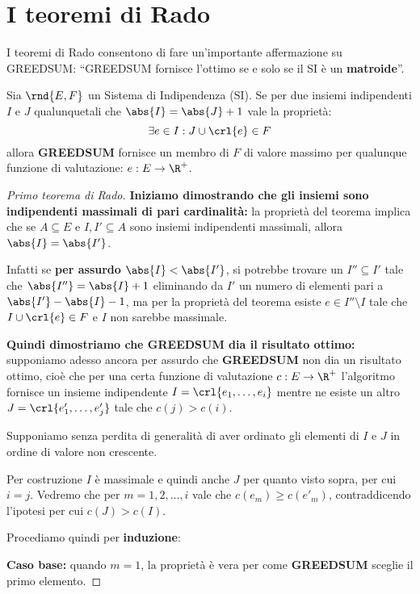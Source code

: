\documentclass[\main/main.tex]{subfiles}
\begin{document}
\section{I teoremi di Rado}
I teoremi di Rado consentono di fare un'importante affermazione su GREEDSUM: ``GREEDSUM fornisce l'ottimo se e solo se il SI è un \textbf{matroide}''.
\begin{theorem}
  Sia \(\rnd{E, F}\) un Sistema di Indipendenza (SI). Se per due insiemi indipendenti \(I\) e \(J\) qualunquetali che \(\abs{I} = \abs{J} + 1\) vale la proprietà:
  \[
    \exists e \in I: J \cup \crl{e} \in F
  \]
  allora \textbf{GREEDSUM} fornisce un membro di \(F\) di valore massimo per qualunque funzione di valutazione: \(e: E \rightarrow \R^+\).
  \label{primo_rado}
\end{theorem}
\begin{proof}[Primo teorema di Rado]
  \textbf{Iniziamo dimostrando che gli insiemi sono indipendenti massimali di pari cardinalità:} la proprietà del teorema implica che se \(A \subseteq E\) e \(I, I' \subseteq A\) sono insiemi indipendenti massimali, allora \(\abs{I} = \abs{I'}\).

  Infatti se \textbf{per assurdo} \(\abs{I} < \abs{I'}\), si potrebbe trovare un \(I'' \subseteq I'\) tale che \(\abs{I''} = \abs{I} + 1\) eliminando da \(I'\) un numero di elementi pari a \(\abs{I'} - \abs{I} - 1\), ma per la proprietà del teorema esiste \(e \in I'' \setminus I\) tale che \(I \cup \crl{e} \in F\) e \(I\) non sarebbe massimale.

  \textbf{Quindi dimostriamo che GREEDSUM dia il risultato ottimo:} supponiamo adesso ancora per assurdo che \textbf{GREEDSUM} non dia un risultato ottimo, cioè che per una certa funzione di valutazione \(c: E \rightarrow \R^+\) l'algoritmo fornisce un insieme indipendente \(I = \crl{e_1, \ldots, e_i}\) mentre ne esiste un altro \(J = \crl{e'_1, \ldots, e'_j}\) tale che \(c(j) > c(i)\).

  Supponiamo senza perdita di generalità di aver ordinato gli elementi di \(I\) e \(J\) in ordine di valore non crescente.

  Per costruzione \(I\) è massimale e quindi anche \(J\) per quanto visto sopra, per cui \(i=j\). Vedremo che per \(m=1, 2, \ldots, i\) vale che \(c(e_m) \geq c(e'_m)\), contraddicendo l'ipotesi per cui \(c(J) > c(I)\).

  Procediamo quindi per \textbf{induzione}:

  \textbf{Caso base:} quando \(m=1\), la proprietà è vera per come \textbf{GREEDSUM} sceglie il primo elemento.


\end{proof}
\end{document}
